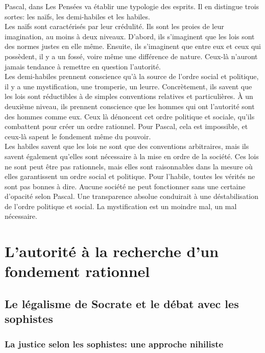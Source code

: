 \documentclass[10pt, a4paper, openany]{book}
\begin{document}
Pascal, dans Les Pensées va établir une typologie des esprits. Il en distingue trois sortes: les naïfs, les demi-habiles et les habiles. \\
Les naïfs sont caractérisés par leur crédulité. Ils sont les proies de leur imagination, au moins à deux niveaux. D'abord, ils s'imaginent que les lois sont des normes justes en elle même. Ensuite, ils s'imaginent que entre eux et ceux qui possèdent, il y a un fossé, voire même une différence de nature. Ceux-là n'auront jamais tendance à remettre en question l'autorité. \\
Les demi-habiles prennent conscience qu'à la source de l'ordre social et politique, il y a une mystification, une tromperie, un leurre. Concrètement, ils savent que les lois sont réductibles à de simples conventions relatives et particulières. À un deuxième niveau, ils prennent conscience que les hommes qui ont l'autorité sont des hommes comme eux. Ceux là dénoncent cet ordre politique et sociale, qu'ils combattent pour créer un ordre rationnel. Pour Pascal, cela est impossible, et ceux-là sapent le fondement même du pouvoir. \\
Les habiles savent que les lois ne sont que des conventions arbitraires, mais ils savent également qu'elles sont nécessaire à la mise en ordre de la société. Ces lois ne sont peut être pas rationnels, mais elles sont raisonnables dans la mesure où elles garantissent un ordre social et politique. Pour l'habile, toutes les vérités ne sont pas bonnes à dire. Aucune société ne peut fonctionner sans une certaine d'opacité selon Pascal. Une transparence absolue conduirait à une déstabilisation de l'ordre politique et social. La mystification est un moindre mal, un mal nécessaire.  

\chapter{L'autorité à la recherche d'un fondement rationnel}

\section{Le légalisme de Socrate et le débat avec les sophistes}

\subsection{La justice selon les sophistes: une approche nihiliste}
\end{document}
